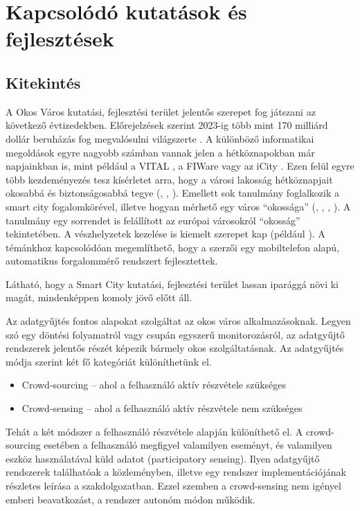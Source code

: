\documentclass[a4paper,12pt]{report}
\begin{document}
\chapter{Kapcsolódó kutatások és fejlesztések}

\section{Kitekintés}

A Okos Város kutatási, fejlesztési terület jelentős szerepet fog játszani az következő évtizedekben. Előrejelzések szerint 2023-ig több mint 170 milliárd dollár beruházás fog megvalósulni világszerte \cite{navigant}. A különböző informatikai megoldások egyre nagyobb számban vannak jelen a hétköznapokban már napjainkban is, mint például a VITAL \cite{vital}, a FI\-Ware \cite{fiware} vagy az iCity \cite{icity}. Ezen felül egyre több kezdeményezés tesz kísérletet arra, hogy a városi lakosság hétköznapjait okosabbá és biztonságosabbá tegye (\cite{smartsantander}, \cite{futureglasgow}, \cite{myneighbourhood}). Emellett sok tanulmány foglalkozik a smart city fogalomkörével, illetve hogyan mérhető egy város ``okossága'' (\cite{yamauchi2014development}, \cite{neirotti2014current}, \cite{de2014smart}, \cite{carli2013measuring}). A \cite{giffinger2007smart} tanulmány egy sorrendet is felállított az európai városokról ``okosság'' tekintetében. A vészhelyzetek kezelése is kiemelt szerepet kap (például \cite{du2012research}). A témánkhoz kapcsolódóan megemlíthető, hogy a \cite{mohan2008nericell} szerzői egy mobiltelefon alapú, automatikus forgalommérő rendszert fejlesztettek.

Látható, hogy a Smart City kutatási, fejlesztési terület lassan iparággá növi ki magát, mindenképpen komoly jövő előtt áll.

Az adatgyűjtés fontos alapokat szolgáltat az okos város alkalmazásoknak. Legyen szó egy döntési folyamatról vagy csupán egyszerű monitorozásról, az adatgyűjtő rendszerek jelentős részét képezik bármely okos szolgáltatásnak. Az adatgyűjtés módja szerint két fő kategóriát különíthetünk el.

\begin{itemize}
\item Crowd-sourcing -- ahol a felhasználó aktív részvétele szükséges
\item Crowd-sensing -- ahol a felhasználó aktív részvétele nem szükséges
\end{itemize}

Tehát a két módszer a felhasználó részvétele alapján különíthető el. A crowd-sourcing esetében a felhasználó megfigyel valamilyen eseményt, és valamilyen eszköz használatával küld adatot (participatory sensing). Ilyen adatgyűjtő rendszerek találhatóak a \cite{szabo2013framework} közleményben, illetve egy rendszer implementációjának részletes leírása a \cite{besenczi2013kozossegi} szakdolgozatban. Ezzel szemben a crowd-sensing nem igényel emberi beavatkozást, a rendszer autonóm módon működik.
\end{document}
